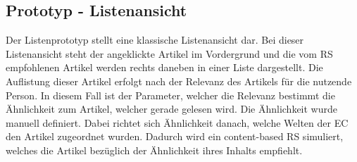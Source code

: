 \subsection{Prototyp - Listenansicht}
Der Listenprototyp stellt eine klassische Listenansicht dar.
Bei dieser Listenansicht steht der angeklickte Artikel im Vordergrund und die vom \ac{RS} empfohlenen Artikel werden rechts daneben in einer Liste dargestellt.
Die Auflistung dieser Artikel erfolgt nach der Relevanz des Artikels für die nutzende Person.
In diesem Fall ist der Parameter, welcher die Relevanz bestimmt die Ähnlichkeit zum Artikel, welcher gerade gelesen wird.
Die Ähnlichkeit wurde manuell definiert.
Dabei richtet sich Ähnlichkeit danach, welche Welten der \ac{EC} den Artikel zugeordnet wurden.
Dadurch wird ein content-based \ac{RS} simuliert, welches die Artikel bezüglich der Ähnlichkeit ihres Inhalts empfiehlt.\\
